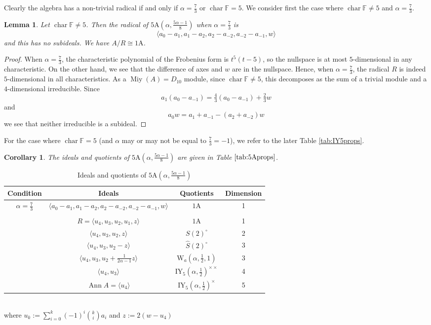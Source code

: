 \documentclass[11pt, a4paper]{article}
\theoremstyle{plain}
\newtheorem{corollary}[theorem]{Corollary}
\newtheorem{lemma}[theorem]{Lemma}
\theoremstyle{definition}
\newcommand\al{\alpha}
\newcommand\la{\langle}
\newcommand\ra{\rangle}
\DeclareMathOperator{\ch}{char}
\DeclareMathOperator{\Ann}{Ann}
\newcommand\FF{\mathbb{F}}
\newcommand{\A}{\mathrm{A}}
\newcommand{\IY}{\mathrm{IY}}
\DeclareMathOperator{\Miy}{Miy}
\newcommand{\Cl}{\widehat{S}(2)^\circ} %
\newcommand{\0}{\overline{0}}
\newcommand{\2}{\overline{2}}
\newcommand{\1}{\mathbbm{1}}
\begin{document}
Clearly the algebra has a non-trivial radical if and only if $\al = \frac{7}{3}$ or $\ch \FF = 5$.  We consider first the case where $\ch \FF \neq 5$ and $\al = \frac{7}{3}$.

\begin{lemma}
Let $\ch \FF \neq 5$.  Then the radical of  $5\A(\al, \frac{5\al-1}{8})$ when $\al = \frac{7}{3}$ is
\[
\la a_0 - a_1, a_1 - a_2, a_2 - a_{-2}, a_{-2} - a_{-1}, w \ra 
\]
and this has no subideals.  We have $A/R \cong 1\A$.
\end{lemma}
\begin{proof}
When $\al = \frac{7}{3}$, the characteristic polynomial of the Frobenius form is $t^5(t-5)$, so the nullspace is at most $5$-dimensional in any characteristic.  On the other hand, we see that the difference of axes and $w$ are in the nullspace.  Hence, when $\al = \frac{7}{3}$, the radical $R$ is indeed $5$-dimensional in all characteristics.  As a $\Miy(A) = D_{10}$ module, since $\ch \FF \neq 5$, this decomposes as the sum of a trivial module and a $4$-dimensional irreducible.  Since
\[
a_1(a_0 - a_{-1}) = \tfrac{4}{3}(a_0 - a_{-1}) + \tfrac{2}{3}w
\]
and
\[
a_0w = a_1 + a_{-1} - (a_2 +a_{-2}) w
\]
we see that neither irreducible is a subideal.
\end{proof}

For the case where $\ch \FF = 5$ (and $\al$ may or may not be equal to $\frac{7}{3} = -1$), we refer to the later Table \ref{tab:IY5props}.

\begin{corollary}
The ideals and quotients of $5\A(\al, \frac{5\al-1}{8})$ are given in Table $\ref{tab:5Aprops}$.
\end{corollary}

\begin{table}[h!tb]
	\renewcommand{\arraystretch}{1.5}
	\centering
	\footnotesize
	\begin{tabular}{c|c|c|c}
		\hline
		Condition & Ideals & Quotients & Dimension \\
		\hline
		 $\al = \tfrac{7}{3}$ & $\la a_0 - a_1, a_1 - a_2, a_2-a_{-2},a_{-2}-a_{-1},w \ra$ & $1\A$ & 1 \\
		 \hline
 		 \multicolumn{4}{c}{\text{When $\ch \FF = 5$}} \\ \hline
 		 & $R = \la u_4, u_3, u_2, u_1, z\ra$ & $1\A$ & 1 \\
		 & $\la u_4, u_3, u_2, z\ra$ & $S(2)^\circ$ & 2 \\
		 & $\la u_4, u_3, u_2 - z\ra$ & $\Cl$ & 3 \\
		 & $\la u_4, u_3, u_2 +\frac{1}{2\al-1}z\ra$ & $\mathrm{W}_a(\al, \frac{1}{2}, 1)$ & 3 \\
		 & $\la u_4, u_3\ra$ & $\IY_5(\al,\frac{1}{2})^{\times\times}$ & 4 \\
		 & $\Ann A = \la u_4 \ra$ & $\IY_5(\al,\frac{1}{2})^\times$ & 5
	\end{tabular}\\
	\vspace{5pt}
	where $u_k := \sum_{i=0}^k (-1)^i \binom{k}{i}a_i$ and $z := 2(w-u_4)$
	\caption{Ideals and quotients of $5\A(\al, \frac{5\al-1}{8})$}\label{tab:5Aprops}
\end{table}
\end{document}
